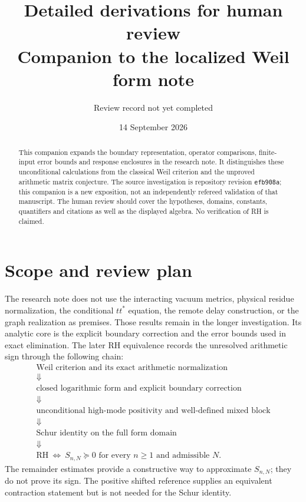 
\title{Detailed derivations for human review\\\large Companion to the localized Weil form note}
\author{Review record not yet completed}\date{14 September 2026}
\maketitle
\begin{abstract}
This companion expands the boundary representation, operator comparisons,
finite-input error bounds and response enclosures in the research note.
It distinguishes these unconditional calculations from the classical Weil
criterion and the unproved arithmetic matrix conjecture. The source
investigation is repository revision \texttt{efb908a}; this companion is a
new exposition, not an independently refereed validation of that manuscript.
The human review should cover the hypotheses, domains, constants, quantifiers
and citations as well as the displayed algebra. No verification of RH is claimed.
\end{abstract}
\setcounter{tocdepth}{1}
\tableofcontents
\clearpage

\section{Scope and review plan}
The research note does not use the interacting vacuum metrics,
physical residue normalization, the conditional $tt^*$ equation, the remote
delay construction, or the graph realization as premises. Those results
remain in the longer investigation. Its analytic core is the explicit
boundary correction and the error bounds used in exact elimination.
The later RH equivalence records the unresolved arithmetic sign through
the following chain:
\[
\begin{gathered}
\text{Weil criterion and its exact arithmetic normalization}\\
\Downarrow\\
\text{closed logarithmic form and explicit boundary correction}\\
\Downarrow\\
\text{unconditional high-mode positivity and well-defined mixed block}\\
\Downarrow\\
\text{Schur identity on the full form domain}\\
\Downarrow\\
\mathrm{RH}\ \Longleftrightarrow\ S_{n,N}\succeq0
\text{ for every }n\ge1\text{ and admissible }N.
\end{gathered}
\]
The remainder estimates provide a constructive way to approximate $S_{n,N}$;
they do not prove its sign. The positive shifted reference supplies an
equivalent contraction statement but is not needed for the Schur identity.

